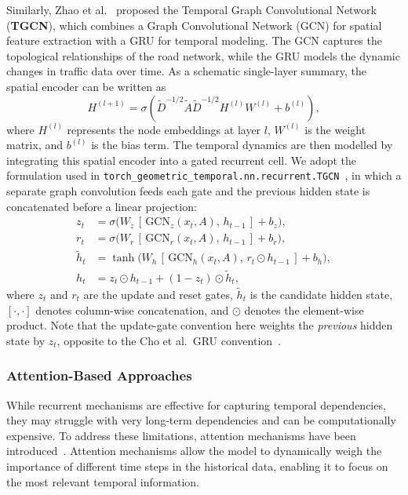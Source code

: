 \documentclass[11pt, a4paper]{article}
\begin{document}
Similarly, Zhao et al.~\cite{zhao_tgcn} proposed the Temporal Graph Convolutional Network (\textbf{TGCN}), which combines a Graph Convolutional Network (GCN) for spatial feature extraction with a GRU for temporal modeling. The GCN captures the topological relationships of the road network, while the GRU models the dynamic changes in traffic data over time. As a schematic single-layer summary, the spatial encoder can be written as
\begin{equation}
  H^{(l+1)} = \sigma\left(\tilde{D}^{-1/2} \tilde{A} \tilde{D}^{-1/2} H^{(l)} W^{(l)} + b^{(l)}\right),
\end{equation}
where \( H^{(l)} \) represents the node embeddings at layer \( l \), \( W^{(l)} \) is the weight matrix, and \( b^{(l)} \) is the bias term. The temporal dynamics are then modelled by integrating this spatial encoder into a gated recurrent cell. We adopt the formulation used in \texttt{torch\_geometric\_temporal.nn.recurrent.TGCN}~\cite{rozemberczki2021pytorch}, in which a separate graph convolution feeds each gate and the previous hidden state is concatenated before a linear projection:
\begin{align}
  z_t &= \sigma\bigl(W_z\,[\,\mathrm{GCN}_z(x_t, A),\,h_{t-1}\,] + b_z\bigr), \\
  r_t &= \sigma\bigl(W_r\,[\,\mathrm{GCN}_r(x_t, A),\,h_{t-1}\,] + b_r\bigr), \\
  \tilde{h}_t &= \tanh\bigl(W_h\,[\,\mathrm{GCN}_h(x_t, A),\,r_t \odot h_{t-1}\,] + b_h\bigr), \\
  h_t &= z_t \odot h_{t-1} + (1 - z_t) \odot \tilde{h}_t,
\end{align}
where \( z_t \) and \( r_t \) are the update and reset gates, $\tilde{h}_t$ is the candidate hidden state, $[\cdot,\cdot]$ denotes column-wise concatenation, and \( \odot \) denotes the element-wise product. Note that the update-gate convention here weights the \emph{previous} hidden state by $z_t$, opposite to the Cho et al.\ GRU convention~\cite{cho2014learning}.

\subsubsection{Attention-Based Approaches}
While recurrent mechanisms are effective for capturing temporal dependencies, they may struggle with very long-term dependencies and can be computationally expensive. To address these limitations, attention mechanisms have been introduced~\cite{bahdanau2014neural}. Attention mechanisms allow the model to dynamically weigh the importance of different time steps in the historical data, enabling it to focus on the most relevant temporal information.
\end{document}
